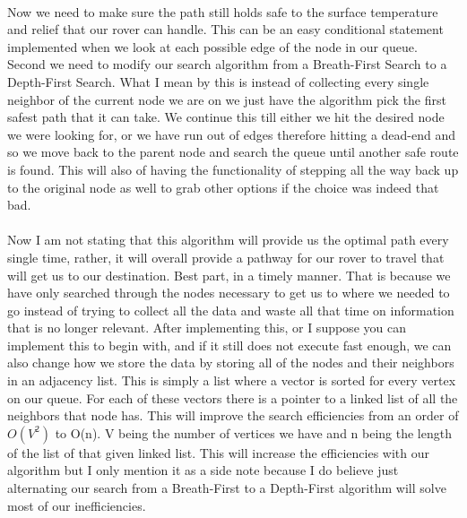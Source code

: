 \documentclass[12pt]{article}
\begin{document}
\\
Now we need to make sure the path still holds safe to the surface temperature and relief that our rover can handle. This can be an easy conditional statement implemented when we look at each possible edge of the node in our queue. Second we need to modify our search algorithm from a Breath-First Search to a Depth-First Search. What I mean by this is instead of collecting every single neighbor of the current node we are on we just have the algorithm pick the first safest path that it can take. We continue this till either we hit the desired node we were looking for, or we have run out of edges therefore hitting a dead-end and so we move back to the parent node and search the queue until another safe route is found. This will also of having the functionality of stepping all the way back up to the original node as well to grab other options if the choice was indeed that bad.\\
\\
Now I am not stating that this algorithm will provide us the optimal path every single time, rather, it will overall provide a pathway for our rover to travel that will get us to our destination. Best part, in a timely manner. That is because we have only searched through the nodes necessary to get us to where we needed to go instead of trying to collect all the data and waste all that time on information that is no longer relevant. After implementing this, or I suppose you can implement this to begin with, and if it still does not execute fast enough, we can also change how we store the data by storing all of the nodes and their neighbors in an adjacency list. This is simply a list where a vector is sorted for every vertex on our queue. For each of these vectors there is a pointer to a linked list of all the neighbors that node has. This will improve the search efficiencies from an order of $O(V^2)$ to O(n). V being the number of vertices we have and n being the length of the list of that given linked list. This will increase the efficiencies with our algorithm but I only mention it as a side note because I do believe just alternating our search from a Breath-First to a Depth-First algorithm will solve most of our inefficiencies. 

\mbox{}
\newpage
\pagebreak
\end{document}
